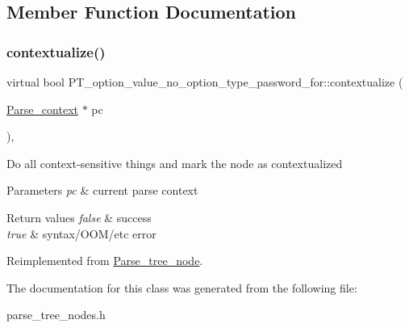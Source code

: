 \subsection{Member Function Documentation}
\mbox{\label{classPT__option__value__no__option__type__password__for_adcaa99ced0dfdcc5f0b706499a9c6ad1}} 
\subsubsection{\texorpdfstring{contextualize()}{contextualize()}}
{\footnotesize\ttfamily virtual bool P\+T\+\_\+option\+\_\+value\+\_\+no\+\_\+option\+\_\+type\+\_\+password\+\_\+for\+::contextualize (\begin{DoxyParamCaption}\item[{\mbox{\hyperlink{structParse__context}{Parse\+\_\+context}} $\ast$}]{pc }\end{DoxyParamCaption})\hspace{0.3cm}{\ttfamily [inline]}, {\ttfamily [virtual]}}

Do all context-\/sensitive things and mark the node as contextualized


\begin{DoxyParams}{Parameters}
{\em pc} & current parse context\\
\hline
\end{DoxyParams}

\begin{DoxyRetVals}{Return values}
{\em false} & success \\
\hline
{\em true} & syntax/\+O\+O\+M/etc error \\
\hline
\end{DoxyRetVals}


Reimplemented from \mbox{\hyperlink{classParse__tree__node_a22d93524a537d0df652d7efa144f23da}{Parse\+\_\+tree\+\_\+node}}.



The documentation for this class was generated from the following file\+:\begin{DoxyCompactItemize}
\item 
parse\+\_\+tree\+\_\+nodes.\+h\end{DoxyCompactItemize}
